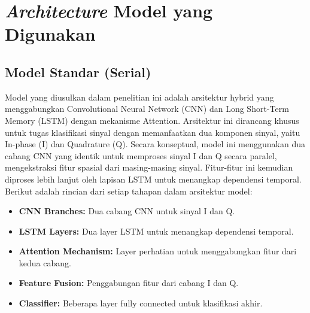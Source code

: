 \documentclass{article}
\begin{document}
\newpage 
\section{\textit{Architecture} Model yang Digunakan}
\subsection{Model Standar (Serial)}
Model yang diusulkan dalam penelitian ini adalah arsitektur hybrid yang menggabungkan Convolutional Neural Network (CNN) dan Long Short-Term Memory (LSTM) dengan mekanisme Attention. 
Arsitektur ini dirancang khusus untuk tugas klasifikasi sinyal dengan memanfaatkan dua komponen sinyal, yaitu In-phase (I) dan Quadrature (Q). 
Secara konseptual, model ini menggunakan dua cabang CNN yang identik untuk memproses sinyal I dan Q secara paralel, mengekstraksi fitur spasial dari masing-masing sinyal. 
Fitur-fitur ini kemudian diproses lebih lanjut oleh lapisan LSTM untuk menangkap dependensi temporal.
Berikut adalah rincian dari setiap tahapan dalam arsitektur model: 

\begin{itemize}
    \item \textbf{CNN Branches:} Dua cabang CNN untuk sinyal I dan Q.
    \item \textbf{LSTM Layers:} Dua layer LSTM untuk menangkap dependensi temporal.
    \item \textbf{Attention Mechanism:} Layer perhatian untuk menggabungkan fitur dari kedua cabang.
    \item \textbf{Feature Fusion:} Penggabungan fitur dari cabang I dan Q.
    \item \textbf{Classifier:} Beberapa layer fully connected untuk klasifikasi akhir.
\end{itemize}
\end{document}
